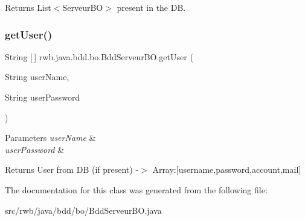 \begin{DoxyReturn}{Returns}
List$<$\+Serveur\+B\+O$>$ present in the DB. 
\end{DoxyReturn}
\mbox{\label{classrwb_1_1java_1_1bdd_1_1bo_1_1_bdd_serveur_b_o_a1676076b91c4f4a89058dd1d450fa8a9}} 
\subsubsection{\texorpdfstring{get\+User()}{getUser()}}
{\footnotesize\ttfamily String \mbox{[}$\,$\mbox{]} rwb.\+java.\+bdd.\+bo.\+Bdd\+Serveur\+B\+O.\+get\+User (\begin{DoxyParamCaption}\item[{String}]{user\+Name,  }\item[{String}]{user\+Password }\end{DoxyParamCaption})}


\begin{DoxyParams}{Parameters}
{\em user\+Name} & \\
\hline
{\em user\+Password} & \\
\hline
\end{DoxyParams}
\begin{DoxyReturn}{Returns}
User from DB (if present) -\/$>$ Array\+:\mbox{[}username,password,account,mail\mbox{]} 
\end{DoxyReturn}


The documentation for this class was generated from the following file\+:\begin{DoxyCompactItemize}
\item 
src/rwb/java/bdd/bo/Bdd\+Serveur\+B\+O.\+java\end{DoxyCompactItemize}

